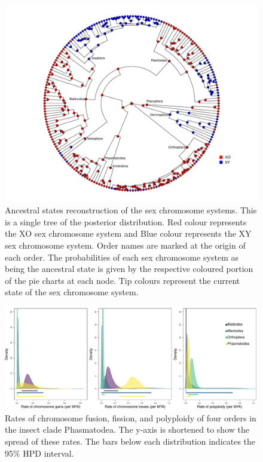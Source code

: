\begin{figure}
\centering \includegraphics[width=1\textwidth]{figures/sex_chrom_asr_phylogeny.pdf}
\caption{
Ancestral states reconstruction of the sex chromosome systems. This is a single tree of the posterior distribution. Red colour represents the XO sex chromosome system and Blue colour represents the XY sex chromosome system. Order names are marked at the origin of each order. The probabilities of each sex chromosome system as being the ancestral state is given by the respective coloured portion of the pie charts at each node. Tip colours represent the current state of the sex chromosome system.}
\label{fig:sex.asr.plot}
\end{figure}

\begin{figure}
\centering \includegraphics[width=1\textwidth]{figures/order_rates_95HPD.pdf}
\caption{Rates of chromosome fusion, fission, and polyploidy of four orders in the insect clade Phasmatodea. The y-axis is shortened to show the spread of these rates. The bars below each distribution indicates the 95\% HPD interval.}
\label{fig:order.rates.95HPD}
\end{figure}

